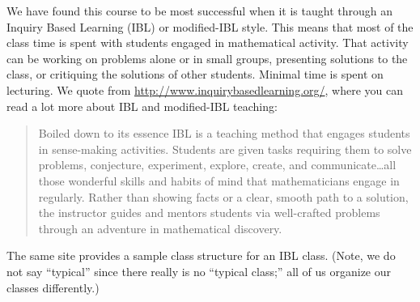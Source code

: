 \documentclass[12pt, reqno]{amsart}
\theoremstyle{remark}
\theoremstyle{definition}
\numberwithin{equation}{section}  %
\begin{document}
We have found this course to be most successful when it is taught through an Inquiry Based Learning (IBL) or modified-IBL style.  This means that most of the class time is spent with students engaged in mathematical activity.  That activity can be working on problems alone or in small groups, presenting solutions to the class, or critiquing the solutions of other students.  Minimal time is spent on lecturing. We quote from \url{http://www.inquirybasedlearning.org/}, where you can read a lot more about IBL and modified-IBL teaching:

\begin{quote}
Boiled down to its essence IBL is a teaching method that engages students in sense-making activities.  Students are given tasks requiring them to solve problems, conjecture, experiment, explore, create, and communicate\dots all those wonderful skills and habits of mind that mathematicians engage in regularly.  Rather than showing facts or a clear, smooth path to a solution, the instructor guides and mentors students via well-crafted problems through an adventure in mathematical discovery.
\end{quote}

The same site provides a sample class structure for an IBL class.  (Note, we do not say ``typical'' since there really is no ``typical class;'' all of us organize our classes differently.)
\end{document}
